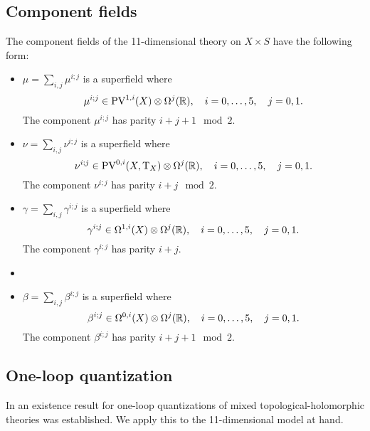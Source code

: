 \subsection{Component fields}

The component fields of the 11-dimensional theory on $X \times S$ have the following form: 
\begin{itemize}
\item $\mu = \sum_{i,j} \mu^{i;j}$ is a superfield where
\[
\mu^{i;j} \in {\rm PV}^{1,i}(X) \otimes \Omega^j(\mathbb R) ,\quad i=0,\ldots, 5, \quad j=0,1.
\]
The component $\mu^{i;j}$ has parity $i+j+1 \mod 2$. 
\item $\nu = \sum_{i,j} \nu^{i;j}$ is a superfield where
\[
\nu^{i;j} \in {\rm PV}^{0,i}(X, {\rm T}_X) \otimes \Omega^j(\mathbb R) ,\quad i=0,\ldots, 5, \quad j=0,1.
\]
The component $\nu^{i;j}$ has parity $i+j \mod 2$. 
\item 
$\gamma = \sum_{i,j} \gamma^{i;j}$ is a superfield where
\[
\gamma^{i;j} \in \Omega^{1,i}(X) \otimes \Omega^j(\mathbb R) ,\quad i=0,\ldots, 5, \quad j=0,1.
\]
The component $\gamma^{i;j}$ has parity $i+j$. 
\item 
\item $\beta = \sum_{i,j} \beta^{i;j}$ is a superfield where
\[
\beta^{i;j} \in \Omega^{0,i}(X) \otimes \Omega^j(\mathbb R) ,\quad i=0,\ldots, 5, \quad j=0,1.
\]
The component $\beta^{i;j}$ has parity $i+j+1 \mod 2$. 
\end{itemize}


\subsection{One-loop quantization}

In \cite{GRWthf} an existence result for one-loop quantizations of mixed topological-holomorphic theories was established. 
We apply this to the 11-dimensional model at hand. 

